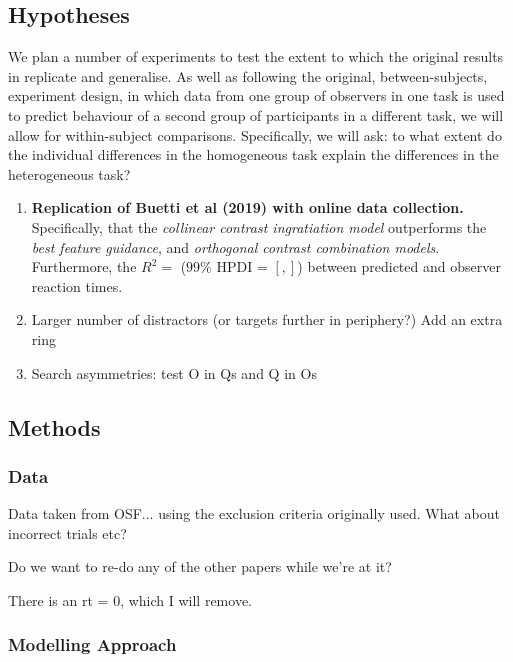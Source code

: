 \documentclass[smallextended]{svjour3}       %
\begin{document}
\subsection{Hypotheses}

We plan a number of experiments to test the extent to which the original results in \cite{buetti2019predicting} replicate and generalise. As well as following the original, between-subjects, experiment design, in which data from one group of observers in one task is used to predict behaviour of a second group of participants in a different task, we will allow for within-subject comparisons. Specifically, we will ask: to what extent do the individual differences in the homogeneous task explain the differences in the heterogeneous task? 

\begin{enumerate}
\item \textbf{Replication of Buetti et al (2019) with online data collection.} Specifically, that the \textit{collinear contrast ingratiation model} outperforms the \textit{best feature guidance}, and \textit{orthogonal contrast combination models}.  Furthermore, the $R^2 = $ ($99\%$ HPDI = $[, ]$) between predicted and observer reaction times.\\
\item Larger number of distractors (or targets further in periphery?) Add an extra ring \\ 
\item Search asymmetries: test O in Qs and Q in Os \\
\end{enumerate}

\subsection{Methods}

\subsubsection{Data}

Data taken from OSF... using the exclusion criteria originally used. What about incorrect trials etc? 

Do we want to re-do any of the other papers while we're at it?

There is an rt = 0, which I will remove. 

\subsubsection{Modelling Approach}
\end{document}
